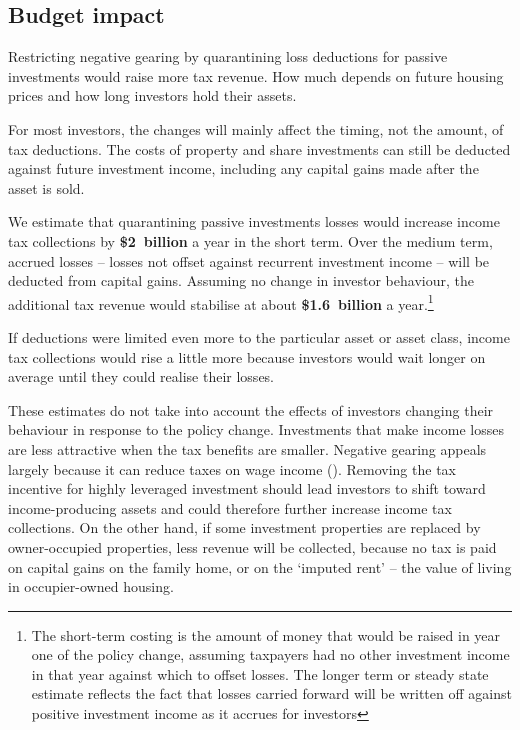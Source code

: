 \subsection{Budget impact}
Restricting negative gearing by quarantining loss deductions for passive investments would raise more tax revenue. How much depends on future housing prices and how long investors hold their assets. \enlargethispage*{0.5\baselineskip}

For most investors, the changes will mainly affect the timing, not the amount, of tax deductions. The costs of property and share investments can still be deducted against future investment income, including any capital gains made after the asset is sold.

We estimate that quarantining passive investments losses  would increase income tax collections by \textbf{\$2~billion} a year in the short term. Over the medium term, accrued losses – losses not offset against recurrent investment income – will be deducted from capital gains. Assuming no change in investor behaviour, the additional tax revenue would stabilise at about \textbf{\$1.6~billion} a year.\footnote{The short-term costing is the amount of money that would be raised in year one of the policy change, assuming taxpayers had no other investment income in that year against which to offset losses. The longer term or steady state estimate reflects the fact that losses carried forward will be written off against positive investment income as it accrues for investors} 

If deductions were limited even more to the particular asset or asset class, income tax collections would rise a little more because investors would wait longer on average until they could realise their losses. 

These estimates do not take into account the effects of investors changing their behaviour in response to the policy change. Investments that make income losses are less attractive when the tax benefits are smaller. Negative gearing appeals largely because it can reduce taxes on wage income (). Removing the tax incentive for highly leveraged investment should lead investors to shift toward income-producing assets and could therefore further increase income tax collections. On the other hand, if some investment properties are replaced by owner-occupied properties, less revenue will be collected, because no tax is paid on capital gains on the family home, or on the ‘imputed rent’ – the value of living in occupier-owned housing.

